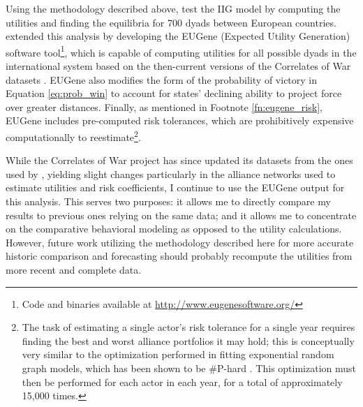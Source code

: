 
Using the methodology described above, \citet{bdm_1992} test the IIG model by computing the utilities and finding the equilibria for 700 dyads between European countries. \citet{bennett_2000} extended this analysis by developing the EUGene (Expected Utility Generation) software tool\footnote{Code and binaries available at \url{http://www.eugenesoftware.org/}}, which is capable of computing utilities for all possible dyads in the international system based on the then-current versions of the Correlates of War datasets \citep{sarkees_2000,jones_1996}. EUGene also modifies the form of the probability of victory in Equation \ref{eq:prob_win} to account for states' declining ability to project force over greater distances. Finally, as mentioned in Footnote \ref{fn:eugene_risk}, EUGene includes pre-computed risk tolerances, which are prohibitively expensive computationally to reestimate\footnote{The task of estimating a single actor's risk tolerance for a single year requires finding the best and worst alliance portfolios it may hold; this is conceptually very similar to the optimization performed in fitting exponential random graph models, which has been shown to be \#P-hard \citep{bannister_2014}. This optimization must then be performed for each actor in each year, for a total of approximately 15,000 times.}.

While the Correlates of War project has since updated its datasets from the ones used by \citet{bennett_2000b}, yielding slight changes particularly in the alliance networks used to estimate utilities and risk coefficients, I continue to use the EUGene output for this analysis. This serves two purposes: it allows me to directly compare my results to previous ones relying on the same data; and it allows me to concentrate on the comparative behavioral modeling as opposed to the utility calculations. However, future work utilizing the methodology described here for more accurate historic comparison and forecasting should probably recompute the utilities from more recent and complete data.

